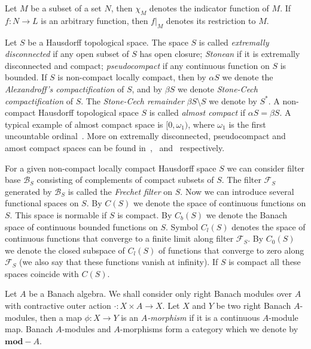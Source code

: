 \documentclass[12pt]{article}
\begin{document}
Let $M$ be a subset of a set $N$, then $\chi_M$ denotes the indicator function
of $M$. If $f:N\to L$ is an arbitrary function, then $f|_M$ denotes its
restriction to $M$.

Let $S$ be a Hausdorff topological space. The space $S$ is called
\textit{extremally disconnected} if any open subset of $S$ has open closure;
\textit{Stonean} if it is extremally disconnected and compact;
\textit{pseudocompact} if any continuous function on $S$ is bounded. If $S$ is
non-compact locally compact, then by $\alpha S$ we denote the
\textit{Alexandroff's compactification} of $S$, and by $\beta S$ we denote
\textit{Stone-Cech compactification} of $S$. The \textit{Stone-Cech remainder}
$\beta S\setminus S$ we denote by $S^*$. A non-compact Hausdorff topological
space $S$ is called \textit{almost compact} if $\alpha S=\beta S$. A typical
example of almost compact space is $[0, \omega_1)$, %
where $\omega_1$ is the first uncountable 
ordinal~\cite[paragraph 1.3]{HrusPsdCompTopSp}. 
More on extremally disconnected, pseudocompact and amost
compact spaces can be found 
in~\cite[section 6.2]{EngkingGenTop},~\cite[section 3.10]{EngkingGenTop} 
and~\cite[paragraph 1.3]{HrusPsdCompTopSp} respectively.

For a given non-compact locally compact Hausdorff space $S$ we can consider
filter base $\mathcal{B}_S$ consisting of complements of compact subsets of $S$.
The filter $\mathcal{F}_S$ generated by $\mathcal{B}_S$ is called the
\textit{Frechet filter} on $S$. Now we can introduce several functional spaces
on $S$. By $C(S)$ we denote the space of continuous functions on $S$. This space
is normable if $S$ is compact. By $C_b(S)$ we denote the Banach space of
continuous bounded functions on $S$. Symbol $C_l(S)$ denotes the space of
continuous functions that converge to a finite limit along filter
$\mathcal{F}_S$. By $C_0(S)$ we denote the closed subspace of $C_l(S)$ of
functions that converge to zero along $\mathcal{F}_S$ (we also say that these
functions vanish at infinity). If $S$ is compact all these spaces coincide with
$C(S)$.

Let $A$ be a Banach algebra. We shall consider only right Banach modules over
$A$ with contractive outer action $\cdot:X\times A\to X$. Let $X$ and $Y$ be two
right Banach $A$-modules, then a map $\phi:X\to Y$ is an \textit{$A$-morphism}
if it is a continuous $A$-module map. Banach $A$-modules and $A$-morphisms form
a category which we denote by $\mathbf{mod}-A$.
\end{document}
